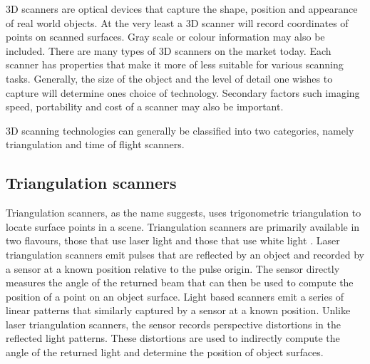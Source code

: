 3D scanners are optical devices that capture the shape, position and appearance of real world objects. At the very least a 3D scanner will record coordinates of points on scanned surfaces. Gray scale or colour information may also be included. There are many types of 3D scanners on the market today. Each scanner has properties that make it more of less suitable for various scanning tasks. Generally, the size of the object and the level of detail one wishes to capture will determine ones choice of technology. Secondary factors such imaging speed, portability and cost of a scanner may also be important.

3D scanning technologies can generally be classified into two categories, namely triangulation and time of flight scanners.

\subsection{Triangulation scanners}

Triangulation scanners, as the name suggests, uses trigonometric triangulation \cite{Frohlich2004} to locate surface points in a scene. Triangulation scanners are primarily available in two flavours, those that use laser light and those that use white light \cite{Brown2012}. Laser triangulation scanners emit pulses that are reflected by an object and recorded by a sensor at a known position relative to the pulse origin. The sensor directly measures the angle of the returned beam that can then be used to compute the position of a point on an object surface. Light based scanners emit a series of linear patterns that similarly captured by a sensor at a known position. Unlike laser triangulation scanners, the sensor records perspective distortions in the reflected light patterns. These distortions are used to indirectly compute the angle of the returned light and determine the position of object surfaces.

